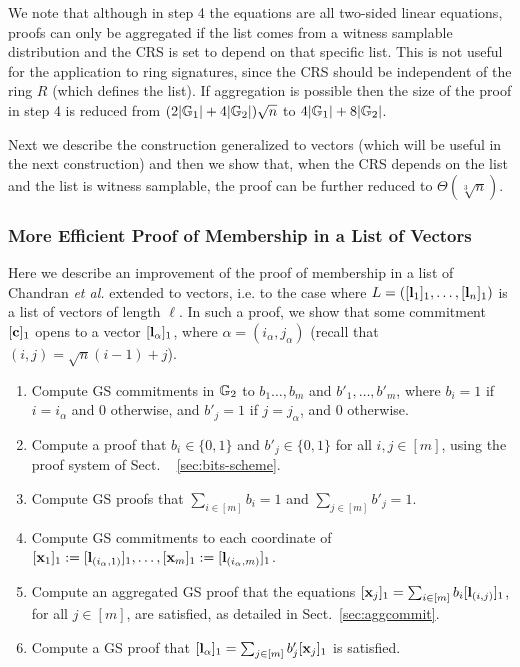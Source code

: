 We note that although in step 4 the equations are all two-sided linear equations, proofs can only be aggregated if the list comes from a witness samplable distribution and the CRS is set to depend on that specific list. 
This is not useful for the application 
to ring signatures, since the CRS should be independent of the ring $R$ (which defines the list). If aggregation is possible then the size of the proof in step 4 is reduced from $(2|\mathbb{G}_1|+4|\mathbb{G}_2|)\sqrt{n}$ to $4|\mathbb{G}_1|+8|\mathbb{G}_2|$.

Next we describe the construction generalized to vectors (which will be useful in the next construction) and then we show that,
when the CRS depends on the list and the list is witness samplable, the proof can be further reduced to $\Theta(\sqrt[3]{n})$.

\subsubsection{More Efficient Proof of Membership in a List of Vectors}  
Here we describe an improvement of the proof of membership in a list of Chandran \textit{et al.}  
extended to vectors, i.e. to the case where $L=([\mathbf{l}_1]_1,\ldots,[\mathbf{l}_n]_1)$ is a list of vectors of length $\ell$. In such a proof, we show that some commitment $[\mathbf{c}]_1$ opens to a vector $[\mathbf{l}_{\alpha}]_1$, where $\alpha=(i_\alpha,j_\alpha)$ (recall that $(i,j)=\sqrt{n}(i-1)+j$).

\begin{enumerate}
\item Compute GS commitments in $\mathbb{G}_2$ to $b_1\ldots,b_m$ and $b'_1,\ldots,b'_m$,
      where $b_i = 1$ if $i=i_\alpha$ and $0$ otherwise, and $b'_{j}=1$ if $j=j_\alpha$, and $0$ otherwise.
\item Compute a proof that $b_i \in \{0,1\}$ and $b'_j \in \{0,1\}$ for all $i,j\in[m]$, using the proof system of Sect.
~ \ref{sec:bits-scheme}.
\item Compute GS proofs that $\sum_{i\in[m]}b_i=1$ and $\sum_{j\in[m]}b'_j=1$. 
\item Compute GS commitments to each coordinate of $[\mathbf{x}_1]_1:=[\mathbf{l}_{(i_\alpha,1)}]_1,\ldots,[\mathbf{x}_m]_1:=[\mathbf{l}_{(i_\alpha,m)}]_1$.
\item Compute an aggregated GS proof that the equations $[\mathbf{x}_j]_1 = \sum_{i\in[m]}b_i[\mathbf{l}_{(i,j)}]_1$, for all $j\in[m]$, are satisfied, as detailed in Sect.~\ref{sec:aggcommit}.
\item Compute a GS proof that $[\mathbf{l}_{\alpha}]_1 = \sum_{j\in[m]}b'_j[\mathbf{x}_j]_1$ is satisfied.
\end{enumerate}

